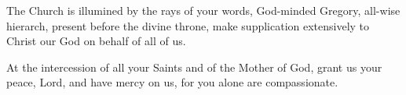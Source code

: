 

The Church is illumined by the rays of your words, God-minded Gregory, all-wise hierarch, present before the divine throne, make supplication extensively to Christ our God on behalf of all of us.




At the intercession of all your Saints and of the Mother of God, grant us your peace, Lord, and have mercy on us, for you alone are compassionate.


\glorybothnow

\greaterinhonour

\glorybothnow


\throughtheprayers

\ornaruleiffits

